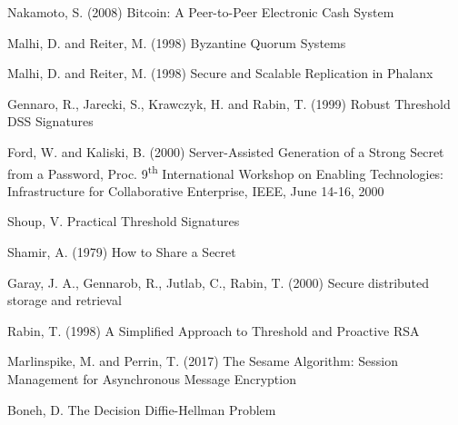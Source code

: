 \begin{thebibliography}{99}

  Nakamoto, S. (2008) Bitcoin: A Peer-to-Peer Electronic Cash System

  Malhi, D. and Reiter, M. (1998) Byzantine Quorum Systems

  Malhi, D. and Reiter, M. (1998) Secure and Scalable Replication in Phalanx

  Gennaro, R., Jarecki, S., Krawczyk, H. and Rabin, T. (1999) Robust
  Threshold DSS Signatures

  Ford, W. and Kaliski, B. (2000) Server-Assisted Generation of a
  Strong Secret from a Password, Proc. 9\textsuperscript{th} International
  Workshop on Enabling Technologies: Infrastructure for Collaborative
  Enterprise, IEEE, June 14-16, 2000

\ifdefined\ABSTRACT
\else
{}
  Shoup, V. Practical Threshold Signatures
\fi
  
  Shamir, A. (1979) How to Share a Secret

  Garay, J. A., Gennarob, R., Jutlab, C., Rabin, T. (2000) Secure
  distributed storage and retrieval

  Rabin, T. (1998) A Simplified Approach to Threshold and Proactive RSA

  Marlinspike, M. and Perrin, T. (2017) The Sesame Algorithm: Session Management for Asynchronous Message Encryption

\ifdefined\ABSTRACT
\else
{}
  Boneh, D. The Decision Diffie-Hellman Problem
\fi
  
\end{thebibliography}
